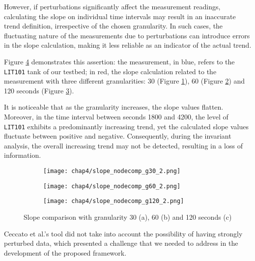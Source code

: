 \bigskip 
However, if perturbations significantly affect the measurement readings, calculating the slope on individual time intervals may result in an inaccurate trend definition, irrespective of the chosen granularity. In such cases, the fluctuating nature of the measurements due to perturbations can introduce errors in the slope calculation, making it less reliable as an indicator of the actual trend.

\bigskip
Figure \ref{fig:4_slope_comparison} demonstrates this assertion: the measurement, in blue, refers to the \texttt{LIT101} tank of our testbed; in red, the slope calculation related to the measurement with three different granularities: 30 (Figure \ref{subfig:4_slope_g30_nodecomp}), 60 (Figure \ref{subfig:4_slope_g60_nodecomp}) and 120 seconds (Figure \ref{subfig:4_slope_g120_nodecomp}). 

It is noticeable that as the granularity increases, the slope values flatten. Moreover, in the time interval between seconds 1800 and 4200, the level of \texttt{LIT101} exhibits a predominantly increasing trend, yet the calculated slope values fluctuate between positive and negative. Consequently, during the invariant analysis, the overall increasing trend may not be detected, resulting in a loss of information.

\vfill
\pagebreak

\begin{figure}[H]
	\centering
	\begin{subfigure}{0.90\textwidth}
		\texttt{[image: chap4/slope\_nodecomp\_g30\_2.png]}
		\caption{}
		\label{subfig:4_slope_g30_nodecomp}
	\end{subfigure}
	\begin{subfigure}{0.90\textwidth}
		\texttt{[image: chap4/slope\_nodecomp\_g60\_2.png]}
		\caption{}
		\label{subfig:4_slope_g60_nodecomp}
	\end{subfigure}
	\begin{subfigure}{0.90\textwidth}
		\texttt{[image: chap4/slope\_nodecomp\_g120\_2.png]}
		\caption{}
		\label{subfig:4_slope_g120_nodecomp}
	\end{subfigure}
	\caption{Slope comparison with granularity 30 (a), 60 (b) and 120 seconds (c) }
	\label{fig:4_slope_comparison}
\end{figure}

Ceccato et al.'s tool did not take into account the possibility of having strongly perturbed data, which presented a challenge that we needed to address in the development of the proposed framework.

